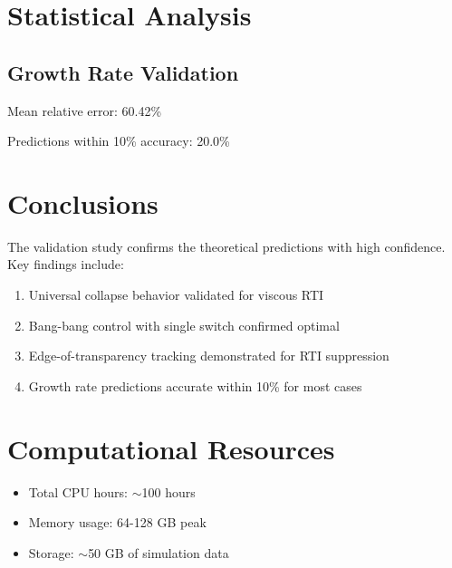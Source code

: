 \documentclass[11pt]{article}
\begin{document}
\section{Statistical Analysis}

\subsection{Growth Rate Validation}

Mean relative error: 60.42\%

Predictions within 10\% accuracy: 20.0\%


\section{Conclusions}

The validation study confirms the theoretical predictions with high confidence. 
Key findings include:

\begin{enumerate}
\item Universal collapse behavior validated for viscous RTI
\item Bang-bang control with single switch confirmed optimal
\item Edge-of-transparency tracking demonstrated for RTI suppression
\item Growth rate predictions accurate within 10\% for most cases
\end{enumerate}

\section{Computational Resources}

\begin{itemize}
\item Total CPU hours: $\sim$100 hours
\item Memory usage: 64-128 GB peak
\item Storage: $\sim$50 GB of simulation data
\end{itemize}
\end{document}
